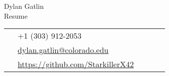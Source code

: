 \documentclass[10pt]{article} %
\begin{document}
\begin{paracol}{2} %

\parbox[top][0.08\textheight][c]{\linewidth}{ %
    \vspace{-0.04\textheight} %
    \centering %
    {\sffamily\Huge Dylan Gatlin}\\\medskip %
    {\Huge\color{headings}\cvtextfont Resume}
}

\switchcolumn
\parbox[top][0.08\textheight][c]{\linewidth}{ %
    \vspace{-0.04\textheight} %
    \colorbox{shade}{ %
        \begin{supertabular}{p{0.05\linewidth}|p{0.775\linewidth}} %
            \raisebox{-1pt}{\faPhone} & +1 (303) 912-2053 \\ %
            \raisebox{0pt}{\small\faEnvelope} & \href{mailto:dylan.gatlin@colorado.edu}{dylan.gatlin@colorado.edu} \\ %
            \raisebox{-1pt}{\faGithub} & \href{https://github.com/StarkillerX42}{https://github.com/StarkillerX42} \\ %
        \end{supertabular}
    }
}
\switchcolumn
\medskip

\end{paracol}
\end{document}
